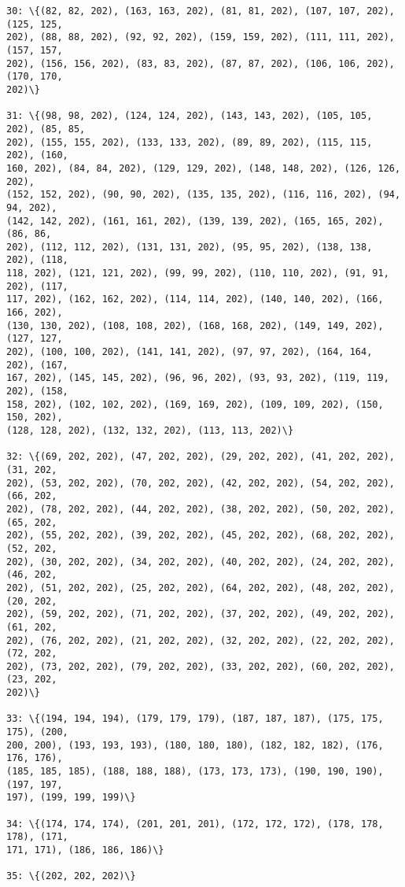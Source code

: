 \documentclass[11pt]{article}
\begin{document}
\begin{Verbatim}[commandchars=\\\{\}]
30: \{(82, 82, 202), (163, 163, 202), (81, 81, 202), (107, 107, 202), (125, 125,
202), (88, 88, 202), (92, 92, 202), (159, 159, 202), (111, 111, 202), (157, 157,
202), (156, 156, 202), (83, 83, 202), (87, 87, 202), (106, 106, 202), (170, 170,
202)\}

31: \{(98, 98, 202), (124, 124, 202), (143, 143, 202), (105, 105, 202), (85, 85,
202), (155, 155, 202), (133, 133, 202), (89, 89, 202), (115, 115, 202), (160,
160, 202), (84, 84, 202), (129, 129, 202), (148, 148, 202), (126, 126, 202),
(152, 152, 202), (90, 90, 202), (135, 135, 202), (116, 116, 202), (94, 94, 202),
(142, 142, 202), (161, 161, 202), (139, 139, 202), (165, 165, 202), (86, 86,
202), (112, 112, 202), (131, 131, 202), (95, 95, 202), (138, 138, 202), (118,
118, 202), (121, 121, 202), (99, 99, 202), (110, 110, 202), (91, 91, 202), (117,
117, 202), (162, 162, 202), (114, 114, 202), (140, 140, 202), (166, 166, 202),
(130, 130, 202), (108, 108, 202), (168, 168, 202), (149, 149, 202), (127, 127,
202), (100, 100, 202), (141, 141, 202), (97, 97, 202), (164, 164, 202), (167,
167, 202), (145, 145, 202), (96, 96, 202), (93, 93, 202), (119, 119, 202), (158,
158, 202), (102, 102, 202), (169, 169, 202), (109, 109, 202), (150, 150, 202),
(128, 128, 202), (132, 132, 202), (113, 113, 202)\}

32: \{(69, 202, 202), (47, 202, 202), (29, 202, 202), (41, 202, 202), (31, 202,
202), (53, 202, 202), (70, 202, 202), (42, 202, 202), (54, 202, 202), (66, 202,
202), (78, 202, 202), (44, 202, 202), (38, 202, 202), (50, 202, 202), (65, 202,
202), (55, 202, 202), (39, 202, 202), (45, 202, 202), (68, 202, 202), (52, 202,
202), (30, 202, 202), (34, 202, 202), (40, 202, 202), (24, 202, 202), (46, 202,
202), (51, 202, 202), (25, 202, 202), (64, 202, 202), (48, 202, 202), (20, 202,
202), (59, 202, 202), (71, 202, 202), (37, 202, 202), (49, 202, 202), (61, 202,
202), (76, 202, 202), (21, 202, 202), (32, 202, 202), (22, 202, 202), (72, 202,
202), (73, 202, 202), (79, 202, 202), (33, 202, 202), (60, 202, 202), (23, 202,
202)\}

33: \{(194, 194, 194), (179, 179, 179), (187, 187, 187), (175, 175, 175), (200,
200, 200), (193, 193, 193), (180, 180, 180), (182, 182, 182), (176, 176, 176),
(185, 185, 185), (188, 188, 188), (173, 173, 173), (190, 190, 190), (197, 197,
197), (199, 199, 199)\}

34: \{(174, 174, 174), (201, 201, 201), (172, 172, 172), (178, 178, 178), (171,
171, 171), (186, 186, 186)\}

35: \{(202, 202, 202)\}


\end{Verbatim}
\end{document}
